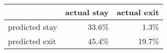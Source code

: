 \begin{tabular}{l|rr}
\toprule
 & \multicolumn{1}{l}{actual stay} & \multicolumn{1}{l|}{actual exit}  \\
\midrule
predicted stay & 33.6\%	 & 1.3\% \\
predicted exit & 45.4\% & 19.7\% \\
\bottomrule
\end{tabular}%
